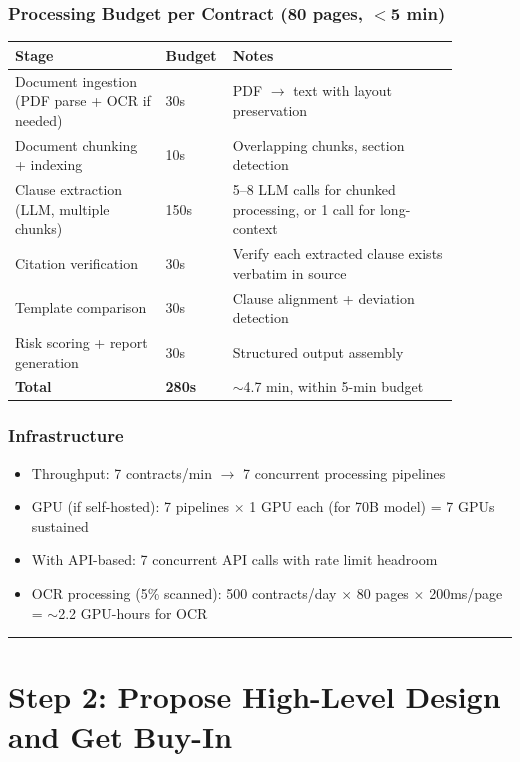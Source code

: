 \subsubsection*{Processing Budget per Contract (80 pages, $<$5 min)}

\begin{tabular}{|p{0.32\linewidth}|p{0.08\linewidth}|p{0.48\linewidth}|}
\hline
\textbf{Stage} & \textbf{Budget} & \textbf{Notes} \\
\hline
Document ingestion (PDF parse + OCR if needed) & 30s & PDF $\rightarrow$ text with layout preservation \\
\hline
Document chunking + indexing & 10s & Overlapping chunks, section detection \\
\hline
Clause extraction (LLM, multiple chunks) & 150s & 5--8 LLM calls for chunked processing, or 1 call for long-context \\
\hline
Citation verification & 30s & Verify each extracted clause exists verbatim in source \\
\hline
Template comparison & 30s & Clause alignment + deviation detection \\
\hline
Risk scoring + report generation & 30s & Structured output assembly \\
\hline
\textbf{Total} & \textbf{280s} & $\sim$4.7 min, within 5-min budget \\
\hline
\end{tabular}

\subsubsection*{Infrastructure}

\begin{itemize}
  \item Throughput: 7 contracts/min $\rightarrow$ 7 concurrent processing pipelines
  \item GPU (if self-hosted): 7 pipelines $\times$ 1 GPU each (for 70B model) = 7 GPUs sustained
  \item With API-based: 7 concurrent API calls with rate limit headroom
  \item OCR processing (5\% scanned): 500 contracts/day $\times$ 80 pages $\times$ 200ms/page = $\sim$2.2 GPU-hours for OCR
\end{itemize}

\bigskip\hrule\bigskip

\section*{Step 2: Propose High-Level Design and Get Buy-In}

